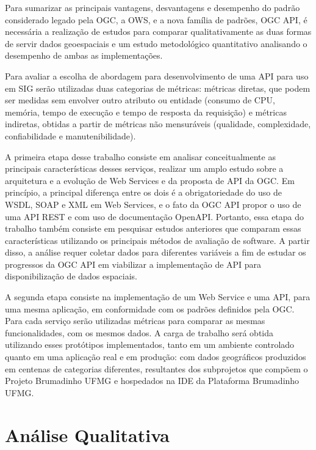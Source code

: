 
Para sumarizar as principais vantagens, desvantagens e desempenho do padrão considerado legado pela OGC, a OWS, e a nova família de padrões, OGC API, é necessária a realização de estudos para comparar qualitativamente as duas formas de servir dados geoespaciais e um estudo metodológico quantitativo analisando o desempenho de ambas as implementações.

Para avaliar a escolha de abordagem para desenvolvimento de uma API para uso em SIG serão utilizadas duas categorias de métricas: métricas diretas, que podem ser medidas sem envolver outro atributo ou entidade (consumo de CPU, memória, tempo de execução e tempo de resposta da requisição) e métricas indiretas, obtidas a partir de métricas não mensuráveis (qualidade, complexidade, confiabilidade e manutenibilidade).

A primeira etapa desse trabalho consiste em analisar conceitualmente as principais características desses serviços, realizar um amplo estudo sobre a arquitetura e a evolução de Web Services e  da proposta de API da OGC. Em princípio, a principal diferença entre os dois é a obrigatoriedade do uso de WSDL, SOAP e XML em Web Services, e o fato da OGC API propor o uso de uma API REST e com uso de documentação OpenAPI. Portanto, essa etapa do trabalho também consiste em pesquisar estudos anteriores que comparam essas características utilizando os principais métodos de avaliação de software. A partir disso, a análise requer coletar dados para diferentes variáveis a fim de estudar os progressos da OGC API em viabilizar a implementação de API para disponibilização de dados espaciais.

A segunda etapa consiste na implementação de um Web Service e uma API, para uma mesma aplicação, em conformidade com os padrões definidos pela OGC. Para cada serviço serão utilizadas métricas para comparar as mesmas funcionalidades, com os mesmos dados. A carga de trabalho será obtida utilizando esses protótipos implementados, tanto em um ambiente controlado quanto em uma aplicação real e em produção: com dados geográficos produzidos em centenas de categorias diferentes, resultantes dos subprojetos que compõem o Projeto Brumadinho UFMG e hospedados na IDE da Plataforma Brumadinho UFMG.


\section{Análise Qualitativa}

